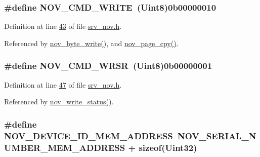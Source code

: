 \hypertarget{a00029_a031aab76ddb1258273541a65d70acbe1}{
\subsubsection[{N\+O\+V\+\_\+\+C\+M\+D\+\_\+\+W\+R\+I\+T\+E}]{\setlength{\rightskip}{0pt plus 5cm}\#define N\+O\+V\+\_\+\+C\+M\+D\+\_\+\+W\+R\+I\+T\+E~({\bf Uint8})0b00000010}}\label{a00029_a031aab76ddb1258273541a65d70acbe1}


Definition at line \hyperlink{a00029_source_l00043}{43} of file \hyperlink{a00029_source}{srv\+\_\+nov.\+h}.



Referenced by \hyperlink{a00060_source_l00608}{nov\+\_\+byte\+\_\+write()}, and \hyperlink{a00060_source_l00663}{nov\+\_\+page\+\_\+cpy()}.

\hypertarget{a00029_a8e00cafebecc8bdde750bb02e504b124}{
\subsubsection[{N\+O\+V\+\_\+\+C\+M\+D\+\_\+\+W\+R\+S\+R}]{\setlength{\rightskip}{0pt plus 5cm}\#define N\+O\+V\+\_\+\+C\+M\+D\+\_\+\+W\+R\+S\+R~({\bf Uint8})0b00000001}}\label{a00029_a8e00cafebecc8bdde750bb02e504b124}


Definition at line \hyperlink{a00029_source_l00047}{47} of file \hyperlink{a00029_source}{srv\+\_\+nov.\+h}.



Referenced by \hyperlink{a00060_source_l00586}{nov\+\_\+write\+\_\+status()}.

\hypertarget{a00029_a3ddbe5b40319c96bfe46429e902f8d33}{
\subsubsection[{N\+O\+V\+\_\+\+D\+E\+V\+I\+C\+E\+\_\+\+I\+D\+\_\+\+M\+E\+M\+\_\+\+A\+D\+D\+R\+E\+S\+S}]{\setlength{\rightskip}{0pt plus 5cm}\#define N\+O\+V\+\_\+\+D\+E\+V\+I\+C\+E\+\_\+\+I\+D\+\_\+\+M\+E\+M\+\_\+\+A\+D\+D\+R\+E\+S\+S~{\bf N\+O\+V\+\_\+\+S\+E\+R\+I\+A\+L\+\_\+\+N\+U\+M\+B\+E\+R\+\_\+\+M\+E\+M\+\_\+\+A\+D\+D\+R\+E\+S\+S} + sizeof({\bf Uint32})}}\label{a00029_a3ddbe5b40319c96bfe46429e902f8d33}


